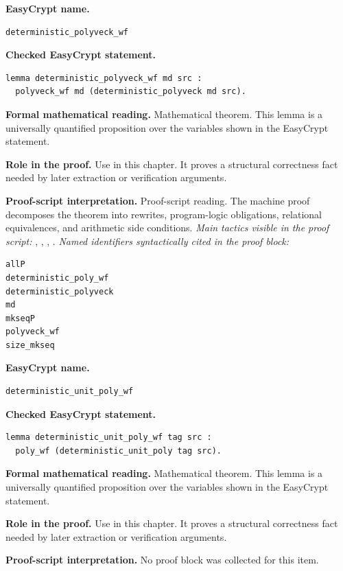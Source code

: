 \begin{formaltheorem}
\noindent\textbf{EasyCrypt name.}
\begin{lstlisting}[language=EasyCrypt,basicstyle=\ttfamily\scriptsize]
deterministic_polyveck_wf
\end{lstlisting}
\noindent\textbf{Checked EasyCrypt statement.}
\begin{lstlisting}[language=EasyCrypt,basicstyle=\ttfamily\scriptsize]
lemma deterministic_polyveck_wf md src :
  polyveck_wf md (deterministic_polyveck md src).
\end{lstlisting}
\noindent\textbf{Formal mathematical reading.}
Mathematical theorem. This lemma is a universally quantified proposition over the variables shown in the EasyCrypt statement.

\noindent\textbf{Role in the proof.}
Use in this chapter. It proves a structural correctness fact needed by later extraction or verification arguments.

\noindent\textbf{Proof-script interpretation.}
Proof-script reading. The machine proof decomposes the theorem into rewrites, program-logic obligations, relational equivalences, and arithmetic side conditions.
\emph{Main tactics visible in the proof script:} , , , .
\emph{Named identifiers syntactically cited in the proof block:}
\begin{lstlisting}[language=EasyCrypt,basicstyle=\ttfamily\scriptsize]
allP
deterministic_poly_wf
deterministic_polyveck
md
mkseqP
polyveck_wf
size_mkseq
\end{lstlisting}

\end{formaltheorem}

\begin{formaltheorem}
\noindent\textbf{EasyCrypt name.}
\begin{lstlisting}[language=EasyCrypt,basicstyle=\ttfamily\scriptsize]
deterministic_unit_poly_wf
\end{lstlisting}
\noindent\textbf{Checked EasyCrypt statement.}
\begin{lstlisting}[language=EasyCrypt,basicstyle=\ttfamily\scriptsize]
lemma deterministic_unit_poly_wf tag src :
  poly_wf (deterministic_unit_poly tag src).
\end{lstlisting}
\noindent\textbf{Formal mathematical reading.}
Mathematical theorem. This lemma is a universally quantified proposition over the variables shown in the EasyCrypt statement.

\noindent\textbf{Role in the proof.}
Use in this chapter. It proves a structural correctness fact needed by later extraction or verification arguments.

\noindent\textbf{Proof-script interpretation.}
No proof block was collected for this item.

\end{formaltheorem}

